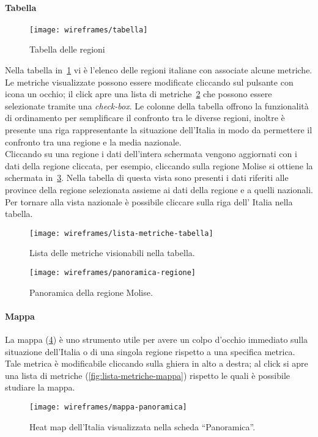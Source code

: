 \paragraph{Tabella}
\begin{figure}[H]
    \centering
    \texttt{[image: wireframes/tabella]}
    \caption{Tabella delle regioni}\label{fig:tabella}
\end{figure}
Nella tabella in~\ref{fig:tabella} vi è l'elenco delle regioni italiane con associate alcune metriche. Le metriche visualizzate possono essere modificate cliccando sul pulsante con icona un occhio; il click apre una lista di metriche~\ref{fig:lista-metriche-tabella} che possono essere selezionate tramite una \textit{check-box}. Le colonne della tabella offrono la funzionalità di ordinamento per semplificare il confronto tra le diverse regioni, inoltre è presente una riga rappresentante la situazione dell'Italia in modo da permettere il confronto tra una regione e la media nazionale.\\
Cliccando su una regione i dati dell'intera schermata vengono aggiornati con i dati della regione cliccata, per esempio, cliccando sulla regione Molise si ottiene la schermata in~\ref{fig:panoramica-regione}. Nella tabella di questa vista sono presenti i dati riferiti alle province della regione selezionata assieme ai dati della regione e a quelli nazionali. Per tornare alla vista nazionale è possibile cliccare sulla riga dell' Italia nella tabella.
\begin{figure}[H]
    \centering
    \texttt{[image: wireframes/lista-metriche-tabella]}
    \caption{Lista delle metriche visionabili nella tabella.}\label{fig:lista-metriche-tabella}
\end{figure}

\begin{figure}[H]
    \centering
    \texttt{[image: wireframes/panoramica-regione]}
    \caption{Panoramica della regione Molise.}\label{fig:panoramica-regione}
\end{figure}

\paragraph{Mappa}
La mappa (\ref{fig:mappa-panoramica}) è uno strumento utile per avere un colpo d'occhio immediato sulla situazione dell'Italia o di una singola regione rispetto a una specifica metrica. Tale metrica è modificabile cliccando sulla ghiera in alto a destra; al click si apre una lista di metriche (\ref{fig:lista-metriche-mappa}) rispetto le quali è possibile studiare la mappa.
\begin{figure}[H]
    \centering
    \texttt{[image: wireframes/mappa-panoramica]}
    \caption{Heat map dell'Italia visualizzata nella scheda ``Panoramica''.}\label{fig:mappa-panoramica}
\end{figure}

